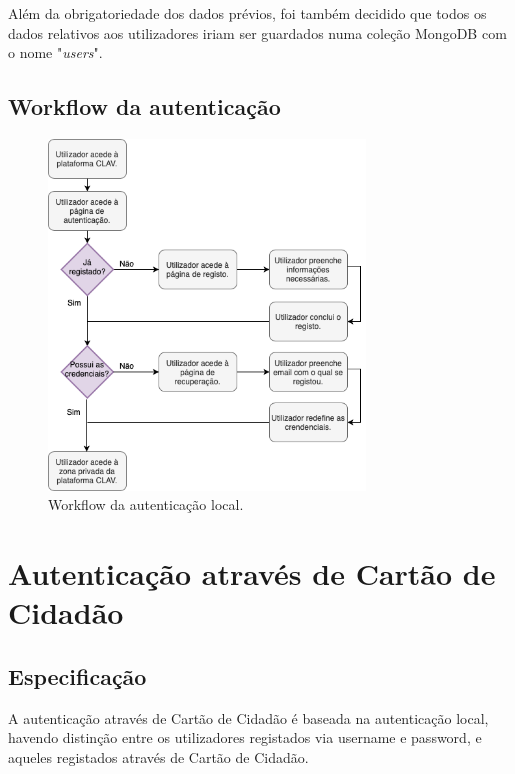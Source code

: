 Além da obrigatoriedade dos dados prévios, foi também decidido que todos os dados relativos aos utilizadores iriam ser guardados numa coleção MongoDB com o nome "\emph{users}".

\subsection{Workflow da autenticação}

\begin{figure}[h]
    \centering
    \includegraphics[width=0.75\textwidth]{img/diagramas/authlocal/AuthLocal.png}
    \caption{Workflow da autenticação local.}
    \label{fig:flow_authlocal}
\end{figure}

\cleardoublepage
\section{Autenticação através de Cartão de Cidadão}
\subsection{Especificação}

A autenticação através de Cartão de Cidadão é baseada na autenticação local, havendo distinção entre os utilizadores registados via username e password, e aqueles registados através de Cartão de Cidadão.

